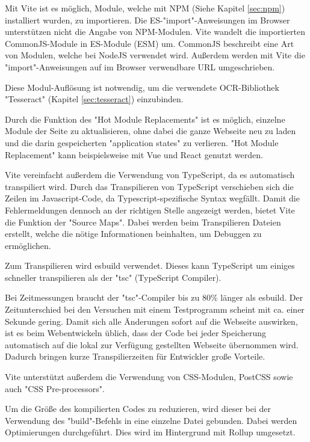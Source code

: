 

Mit Vite ist es möglich, Module, welche mit NPM (Siehe Kapitel \ref{sec:npm}) installiert wurden, zu importieren. 
Die ES-"import"-Anweisungen im Browser unterstützen nicht die Angabe von NPM-Modulen. Vite wandelt die importierten CommonJS-Module in ES-Module (ESM) um. CommonJS beschreibt eine Art von Modulen, welche bei NodeJS verwendet wird. Außerdem werden mit Vite die "import"-Anweisungen auf im Browser verwendbare URL umgeschrieben. \cite{ViteFeatures}


Diese Modul-Auflösung ist notwendig, um die verwendete OCR-Bibliothek "Tesseract" (Kapitel \ref{sec:tesseract}) einzubinden. 


Durch die Funktion des "Hot Module Replacements" ist es möglich, einzelne Module der Seite zu aktualisieren, ohne dabei die ganze Webseite neu zu laden und die darin gespeicherten "application states" zu verlieren. "Hot Module Replacement" kann beispielsweise mit Vue und React genutzt werden. \cite{ViteFeatures}
  

Vite vereinfacht außerdem die Verwendung von TypeScript, da es automatisch transpiliert wird. 
Durch das Transpilieren von TypeScript verschieben sich die Zeilen im Javascript-Code, da Typescript-spezifische Syntax wegfällt. 
Damit die Fehlermeldungen dennoch an der richtigen Stelle angezeigt werden, bietet Vite die Funktion der "Source Maps". 
Dabei werden beim Transpilieren Dateien erstellt, welche die nötige Informationen beinhalten, um Debuggen zu ermöglichen.

Zum Transpilieren wird esbuild\cite{esbuild} verwendet. Dieses kann TypeScript um einiges schneller transpilieren als der "tsc" (TypeScript Compiler). \cite{ViteFeatures}

Bei Zeitmessungen braucht der "tsc"-Compiler bis zu 80\% länger als esbuild. Der Zeitunterschied bei den Versuchen mit einem Testprogramm scheint mit ca. einer Sekunde gering. Damit sich alle Änderungen sofort auf die Webseite auswirken, ist es beim Web\-entwickeln üblich, dass der Code bei jeder Speicherung automatisch auf die lokal zur Verfügung gestellten Webseite übernommen wird. Dadurch bringen kurze Transpilierzeiten für Entwickler große Vorteile. 


Vite unterstützt außerdem die Verwendung von CSS-Modulen, PostCSS sowie auch "CSS Pre-processors". \cite{ViteFeatures}


Um die Größe des kompilierten Codes zu reduzieren, wird dieser bei der Verwendung des "build"-Befehls in eine einzelne Datei gebunden. Dabei werden Optimierungen durchgeführt. Dies wird im Hintergrund mit Rollup \cite{Rollup} umgesetzt. 


    
    

